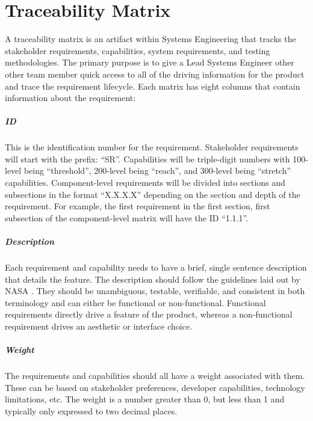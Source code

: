 \chapter{Traceability Matrix} 
A traceability matrix is an artifact within Systems Engineering that tracks the stakeholder requirements, capabilities, system requirements, and testing methodologies.
The primary purpose is to give a Lead Systems Engineer other other team member quick access to all of the driving information for the product and trace the requirement lifecycle.
Each matrix has eight columns that contain information about the requirement:

\paragraph*{ID} This is the identification number for the requirement.
Stakeholder requirements will start with the prefix: ``SR''.
Capabilities will be triple-digit numbers with 100-level being ``threshold'', 200-level being ``reach'', and 300-level being ``stretch'' capabilities.
Component-level requirements will be divided into sections and subsections in the format ``X.X.X.X'' depending on the section and depth of the requirement.
For example, the first requirement in the first section, first subsection of the component-level matrix will have the ID ``1.1.1''.

\paragraph*{Description} Each requirement and capability needs to have a brief, single sentence description that details the feature.
The description should follow the guidelines laid out by NASA \cite{SystemsEngineeringHandbook-AppendixC}.
They should be unambiguous, testable, verifiable, and consistent in both terminology and can either be functional or non-functional.
Functional requirements directly drive a feature of the product, whereas a non-functional requirement drives an aesthetic or interface choice.

\paragraph*{Weight} The requirements and capabilities should all have a weight associated with them.
These can be based on stakeholder preferences, developer capabilities, technology limitations, etc.
The weight is a number greater than 0, but less than 1 and typically only expressed to two decimal places.

